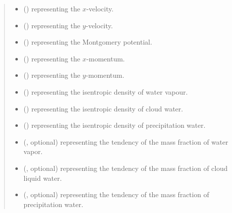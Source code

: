 \documentclass[letterpaper,10pt,english]{sphinxmanual}
\begin{document}
\begin{fulllineitems}
\begin{fulllineitems}
\begin{quote}
\begin{description}
\begin{itemize}
\item {} 
 () \textendash{}  representing the \(x\)-velocity.

\item {} 
 () \textendash{}  representing the \(y\)-velocity.

\item {} 
 () \textendash{}  representing the Montgomery potential.

\item {} 
 () \textendash{}  representing the \(x\)-momentum.

\item {} 
 () \textendash{}  representing the \(y\)-momentum.

\item {} 
 () \textendash{}  representing the isentropic density of water vapour.

\item {} 
 () \textendash{}  representing the isentropic density of cloud water.

\item {} 
 () \textendash{}  representing the isentropic density of precipitation water.

\item {} 
 (, optional) \textendash{}  representing the tendency of the mass fraction of water vapor.

\item {} 
 (, optional) \textendash{}  representing the tendency of the mass fraction of cloud liquid water.

\item {} 
 (, optional) \textendash{}  representing the tendency of the mass fraction of precipitation water.


\end{itemize}
\end{description}
\end{quote}
\end{fulllineitems}
\end{fulllineitems}
\end{document}
